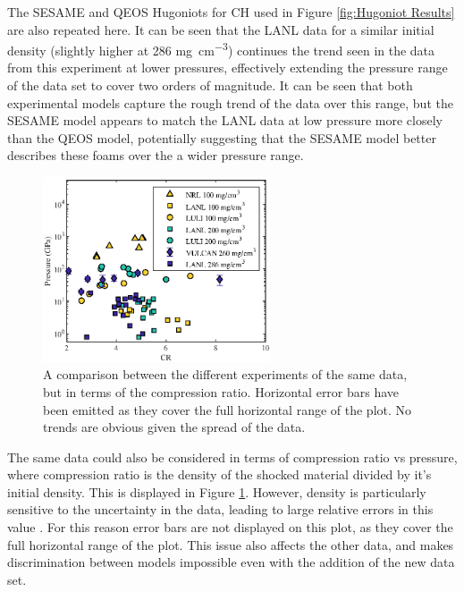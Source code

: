 The SESAME and QEOS Hugoniots for CH used in Figure \ref{fig:Hugoniot Results} are also repeated here. It can be seen that the LANL data for a similar initial density (slightly higher at 286 \unit{\milli\gram\per\centi\meter\cubed}) continues the trend seen in the data from this experiment at lower pressures, effectively extending the pressure range of the data set to cover two orders of magnitude. It can be seen that both experimental models capture the rough trend of the data over this range, but the SESAME model appears to match the LANL data at low pressure more closely than the QEOS model, potentially suggesting that the SESAME model better describes these foams over the a wider pressure range.

\begin{figure} [h!]
\begin{centering}
\includegraphics[width=0.6\textwidth]{figures/Experiment/OtherDataCR.eps}%
\caption{\label{fig:Other Foam Data CR} A comparison between the different experiments of the same data, but in terms of the compression ratio. Horizontal error bars have been emitted as they cover the full horizontal range of the plot. No trends are obvious given the spread of the data. }
\end{centering}
\end{figure}

The same data could also be considered in terms of compression ratio vs pressure, where compression ratio is the density of the shocked material divided by it's initial density. This is displayed in Figure \ref{fig:Other Foam Data CR}. However, density is particularly sensitive to the uncertainty in the data, leading to large relative errors in this value \cite{LePape2008}. For this reason error bars are not displayed on this plot, as they cover the full horizontal range of the plot. This issue also affects the other data, and makes discrimination between models impossible even with the addition of the new data set.











